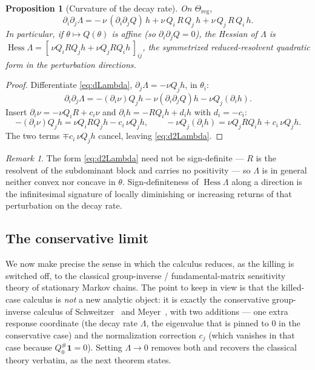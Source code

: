 \documentclass[11pt,reqno]{amsart}
\theoremstyle{plain}
\newtheorem{proposition}[theorem]{Proposition}
\theoremstyle{definition}
\theoremstyle{remark}
\newtheorem{remark}[theorem]{Remark}
\newcommand{\Reg}{\Theta_{\mathrm{reg}}}
\newcommand{\one}{\mathbf{1}}
\DeclareMathOperator{\Hess}{Hess}
\begin{document}
\begin{proposition}[Curvature of the decay rate]\label{prop:second-order}
On $\Reg$,
\begin{equation}\label{eq:d2Lambda}
\partial_i\partial_j\Lambda
=-\,\nu\,(\partial_i\partial_jQ)\,h
+\nu\,Q_i\,R\,Q_j\,h
+\nu\,Q_j\,R\,Q_i\,h .
\end{equation}
In particular, if $\theta\mapsto Q(\theta)$ is affine \textup{(}so
$\partial_i\partial_jQ=0$\textup{)}, the Hessian of $\Lambda$ is
$\Hess\Lambda=[\,\nu Q_iRQ_jh+\nu Q_jRQ_ih\,]_{ij}$, the symmetrized reduced-resolvent
quadratic form in the perturbation directions.
\end{proposition}

\begin{proof}
Differentiate \eqref{eq:dLambda}, $\partial_j\Lambda=-\nu Q_jh$, in $\theta_i$:
\[
\partial_i\partial_j\Lambda
=-(\partial_i\nu)Q_jh-\nu(\partial_i\partial_jQ)h-\nu Q_j(\partial_ih).
\]
Insert $\partial_i\nu=-\nu Q_iR+c_i\nu$ and $\partial_ih=-RQ_ih+d_ih$ with
$d_i=-c_i$:
\[
-(\partial_i\nu)Q_jh=\nu Q_iRQ_jh-c_i\,\nu Q_jh,\qquad
-\nu Q_j(\partial_ih)=\nu Q_jRQ_ih+c_i\,\nu Q_jh .
\]
The two terms $\mp c_i\,\nu Q_jh$ cancel, leaving \eqref{eq:d2Lambda}.
\end{proof}

\begin{remark}\label{rem:convexity}
The form \eqref{eq:d2Lambda} need not be sign-definite --- $R$ is the resolvent of
the subdominant block and carries no positivity --- so $\Lambda$ is in general
neither convex nor concave in $\theta$. Sign-definiteness of $\Hess\Lambda$ along a
direction is the infinitesimal signature of locally diminishing or increasing
returns of that perturbation on the decay rate.
\end{remark}

\subsection{The conservative limit}\label{sec:conservative-limit}

We now make precise the sense in which the calculus reduces, as the killing is
switched off, to the classical group-inverse / fundamental-matrix sensitivity
theory of stationary Markov chains. The point to keep in view is that the killed-case
calculus is \emph{not} a new analytic object: it is exactly the conservative
group-inverse calculus of Schweitzer~\cite{Schweitzer1968} and
Meyer~\cite{Meyer1975}, with two additions --- one extra response coordinate (the
decay rate $\Lambda$, the eigenvalue that is pinned to $0$ in the conservative case)
and the normalization correction $c_j$ (which vanishes in that case because
$Q_0^{\#}\one=0$). Setting $\Lambda\to0$ removes both and recovers the classical
theory verbatim, as the next theorem states.
\end{document}
